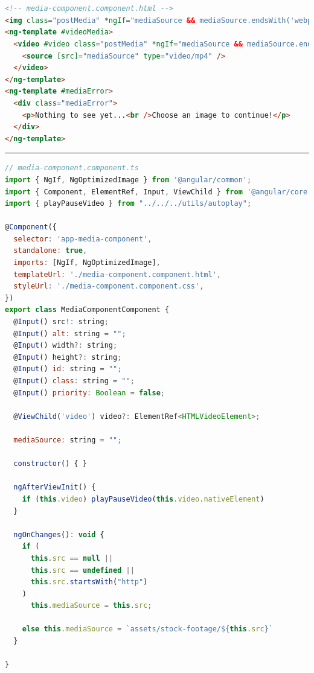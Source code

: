 \documentclass[a4paper, 12pt]{article}
\makeatletter
\renewcommand\lstlistoflistings{
  \section{\lstlistlistingname}
  \@starttoc{lol}%
}
\makeatother
\begin{document}
\pagebreak

\appendix

\lstlistoflistings

\pagebreak

\begin{lstlisting}[caption=MediaComponent in Angular (Template), label={lst:Angular:MediaComponent:Template}, language=HTML]
<!-- media-component.component.html -->
<img class="postMedia" *ngIf="mediaSource && mediaSource.endsWith('webp'); else videoMedia" [ngSrc]="mediaSource" [alt]="alt" [width]="width?.endsWith('%') ? 600 : width" [height]="height || (width?.endsWith('%') ? 600 : width)" [id]="id" [class]="class" [sizes]="width!" [priority]="priority" />
<ng-template #videoMedia>
  <video #video class="postMedia" *ngIf="mediaSource && mediaSource.endsWith('mp4'); else mediaError" [attr.width]="width" controls controlslist="nodownload,nofullscreen,noremoteplayback" disablepictureinpicture loop [muted]="true" preload="metadata" >
    <source [src]="mediaSource" type="video/mp4" />
  </video>
</ng-template>
<ng-template #mediaError>
  <div class="mediaError">
    <p>Nothing to see yet...<br />Choose an image to continue!</p>
  </div>
</ng-template>
\end{lstlisting}

\vspace{0.5cm} \hrule \vspace{0.5cm}

\begin{lstlisting}[caption=MediaComponent in Angular (Module), label={lst:Angular:MediaComponent:Module}, language=JavaScript]
// media-component.component.ts
import { NgIf, NgOptimizedImage } from '@angular/common';
import { Component, ElementRef, Input, ViewChild } from '@angular/core';
import { playPauseVideo } from "../../../utils/autoplay";

@Component({
  selector: 'app-media-component',
  standalone: true,
  imports: [NgIf, NgOptimizedImage],
  templateUrl: './media-component.component.html',
  styleUrl: './media-component.component.css',
})
export class MediaComponentComponent {
  @Input() src!: string;
  @Input() alt: string = "";
  @Input() width?: string;
  @Input() height?: string;
  @Input() id: string = "";
  @Input() class: string = "";
  @Input() priority: Boolean = false;

  @ViewChild('video') video?: ElementRef<HTMLVideoElement>;

  mediaSource: string = "";

  constructor() { }

  ngAfterViewInit() {
    if (this.video) playPauseVideo(this.video.nativeElement)
  }

  ngOnChanges(): void {
    if (
      this.src == null ||
      this.src == undefined ||
      this.src.startsWith("http")
    )
      this.mediaSource = this.src;

    else this.mediaSource = `assets/stock-footage/${this.src}`
  }

}
\end{lstlisting}
\end{document}
